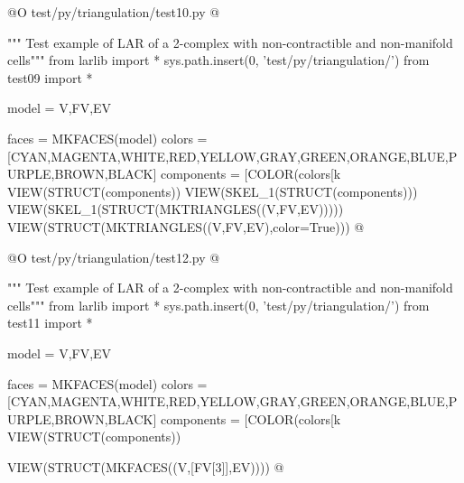 \documentclass[11pt,oneside]{article}    %
\begin{document}
@O test/py/triangulation/test10.py
@{""" Test example of LAR of a 2-complex with non-contractible and non-manifold cells"""
from larlib import *
sys.path.insert(0, 'test/py/triangulation/')
from test09 import *

model = V,FV,EV

faces = MKFACES(model)
colors = [CYAN,MAGENTA,WHITE,RED,YELLOW,GRAY,GREEN,ORANGE,BLUE,PURPLE,BROWN,BLACK]
components = [COLOR(colors[k%
VIEW(STRUCT(components))
VIEW(SKEL_1(STRUCT(components)))
VIEW(SKEL_1(STRUCT(MKTRIANGLES((V,FV,EV))))) 
VIEW(STRUCT(MKTRIANGLES((V,FV,EV),color=True)))
@}
@O test/py/triangulation/test12.py
@{""" Test example of LAR of a 2-complex with non-contractible and non-manifold cells"""
from larlib import *
sys.path.insert(0, 'test/py/triangulation/')
from test11 import *

model = V,FV,EV

faces = MKFACES(model)
colors = [CYAN,MAGENTA,WHITE,RED,YELLOW,GRAY,GREEN,ORANGE,BLUE,PURPLE,BROWN,BLACK]
components = [COLOR(colors[k%
VIEW(STRUCT(components))

VIEW(STRUCT(MKFACES((V,[FV[3]],EV))))
@}
\end{document}
